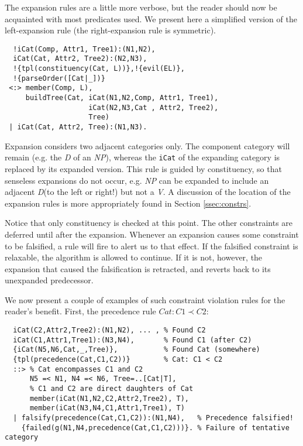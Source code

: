 \documentclass{llncs}
\newcommand{\precedence}[3]{\textit{#1} : \textit{#2} \prec \textit{#3}}
\newcommand{\NP}{\textit{NP}\xspace}
\newcommand{\V}{\textit{V}\xspace}
\newcommand{\D}{\textit{D}\xspace}
\begin{document}
The expansion rules are a little more verbose, but the reader should now be acquainted with most predicates used. We present here a simplified version of the left-expansion rule (the right-expansion rule is symmetric).

\begin{verbatim}
  !iCat(Comp, Attr1, Tree1):(N1,N2), 
  iCat(Cat, Attr2, Tree2):(N2,N3),
  !{tpl(constituency(Cat, L))},!{evil(EL)},
  !{parseOrder([Cat|_])}
 <:> member(Comp, L),
     buildTree(Cat, iCat(N1,N2,Comp, Attr1, Tree1),
                    iCat(N2,N3,Cat , Attr2, Tree2),
                    Tree)
 | iCat(Cat, Attr2, Tree):(N1,N3).
\end{verbatim}

Expansion considers two adjacent categories only. The component category will remain (e.g. the \D of an \NP), whereas the \texttt{iCat} of the expanding category is replaced by its expanded version. This rule is guided by constituency, so that senseless expansions do not occur, e.g. \NP can be expanded to include an adjacent \D (to the left or right!) but not a \V. A discussion of the location of the expansion rules is more appropriately found in Section \ref{ssec:constrs}.

Notice that only constituency is checked at this point. The other constraints are deferred until after the expansion. Whenever an expansion causes some constraint to be falsified, a rule will fire to alert us to that effect. If the falsified constraint is relaxable, the algorithm is allowed to continue. If it is not, however, the expansion that caused the falsification is retracted, and reverts back to its unexpanded predecessor.

We now present a couple of examples of such constraint violation rules for the reader's benefit. First, the precedence rule $\precedence{Cat}{C1}{C2}$:

\begin{verbatim}
  iCat(C2,Attr2,Tree2):(N1,N2), ... , % Found C2
  iCat(C1,Attr1,Tree1):(N3,N4),       % Found C1 (after C2)
  {iCat(N5,N6,Cat,_,Tree)},           % Found Cat (somewhere)
  {tpl(precedence(Cat,C1,C2))}        % Cat: C1 < C2
  ::> % Cat encompasses C1 and C2
      N5 =< N1, N4 =< N6, Tree=..[Cat|T],
      % C1 and C2 are direct daughters of Cat
      member(iCat(N1,N2,C2,Attr2,Tree2), T),
      member(iCat(N3,N4,C1,Attr1,Tree1), T)
  | falsify(precedence(Cat,C1,C2)):(N1,N4),   % Precedence falsified!
    {failed(g(N1,N4,precedence(Cat,C1,C2)))}. % Failure of tentative category
\end{verbatim}
\end{document}
